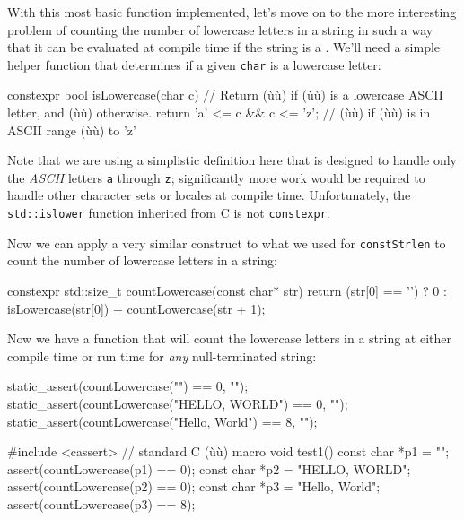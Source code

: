 \noindent With this most basic function implemented, let's move on to the more
interesting problem of counting the number of lowercase letters in a
string in such a way that it can be evaluated at compile time if the
string is a . We'll need a simple helper
function that determines if a given \lstinline!char! is a lowercase letter:

\begin{emcppslisting}[emcppsbatch={e12,e13}]
constexpr bool isLowercase(char c)
    // Return (ù{}ù) if (ù{}ù) is a lowercase ASCII letter, and (ù{}ù) otherwise.
{
    return 'a' <= c && c <= 'z';  // (ù{}ù) if (ù{}ù) is in ASCII range (ù{}ù) to 'z'
}
\end{emcppslisting}
    

\noindent Note that we are using a simplistic definition here that is designed to
handle only the \emph{ASCII} letters \lstinline!a! through \lstinline!z!;
significantly more work would be required to handle other character sets
or locales at compile time. Unfortunately, the \lstinline!std::islower!
function inherited from C is not \lstinline!constexpr!.

Now we can apply a very similar construct to what we used for
\lstinline!constStrlen! to count the number of lowercase letters in a
string:

\begin{emcppslisting}[emcppsbatch=e12]
constexpr std::size_t countLowercase(const char* str)
{
    return (str[0] == '\0') ? 0 : isLowercase(str[0]) + countLowercase(str + 1);
}
\end{emcppslisting}
    

\noindent Now we have a function that will count the lowercase letters in a string
at either compile time or run time for \emph{any} null-terminated
string:

\begin{emcppslisting}[emcppsbatch=e12]
static_assert(countLowercase("") == 0, "");
static_assert(countLowercase("HELLO, WORLD") == 0, "");
static_assert(countLowercase("Hello, World") == 8, "");

#include <cassert>  // standard C (ù{}ù) macro
void test1()
{
     const char *p1 = "";              assert(countLowercase(p1) == 0);
     const char *p2 = "HELLO, WORLD";  assert(countLowercase(p2) == 0);
     const char *p3 = "Hello, World";  assert(countLowercase(p3) == 8);
}
\end{emcppslisting}
    

